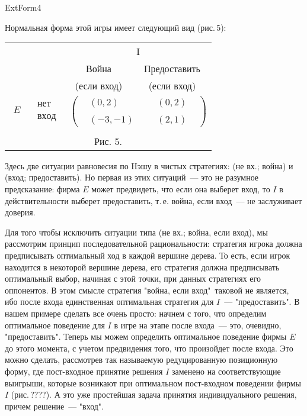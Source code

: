 \documentclass[12pt]{article}
\begin{document}
ExtForm4


Нормальная форма этой игры имеет следующий вид (рис.\,5):

\begin{center}
\begin{tabular}{cccc}
&&\multicolumn{2}{c}{I}\\
&& Война &  Предоставить\\
&&(если вход)&   (если вход) \\
$\begin{array}{c} {}\\ E\\ {}\\ \end{array}$ &$\begin{array}{c} нет\\ \\
вход\end{array}$& \multicolumn{2}{c}{
$\left(\begin{array}{cccccc} &(0,2)&&&(0,2)&\\
\\
&(-3,-1)&&&(2,1)& \end{array} \right)$}\\
\multicolumn{4}{c}{}\\
\multicolumn{4}{c}{Рис. 5.}\\
\end{tabular}
\end{center}

Здесь две ситуации равновесия по Hэшу  в чистых стратегиях: (не
вх.; война) и (вход; предоставить).  Но первая из этих
ситуаций~--- это не разумное предсказание: фирма $E$ может
предвидеть, что если она выберет вход, то $I$ в действительности
выберет предоставить, т.\,е. война, если вход~--- не заслуживает
доверия.

Для того чтобы исключить ситуации типа (не вх.; война, если вход),
мы рассмотрим принцип последовательной рациональности: стратегия
игрока должна предписывать оптимальный ход в каждой вершине
дерева. То есть, если игрок находится в некоторой вершине дерева,
его стратегия должна предписывать оптимальный выбор, начиная с
этой точки, при данных стратегиях его оппонентов.  В этом смысле
стратегия "война, если вход"\, таковой не является, ибо после
входа единственная оптимальная стратегия для $I$~---
"предоставить".  В нашем примере сделать все очень просто: начнем
с того, что определим оптимальное поведение для $I$ в игре на
этапе после входа~--- это, очевидно, "предоставить".  Теперь мы
можем определить оптимальное поведение фирмы $E$ до этого момента,
с учетом предвидения того, что произойдет после входа. Это можно
сделать, рассмотрев так называемую редуцированную позиционную
форму, где пост-входное принятие решения $I$ заменено на
соответствующие выигрыши, которые возникают при оптимальном
пост-входном поведении фирмы $I$ (рис.\,????). А это уже
простейшая задача принятия индивидуального решения, причем
решение~--- "вход".
\end{document}
